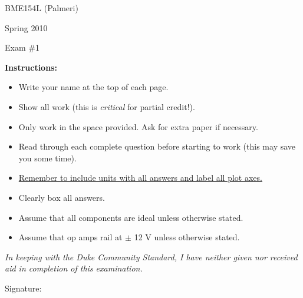 

\vspace*{0.5in}

\centerline{\LARGE BME154L (Palmeri)}
\vspace*{0.25in}
\centerline{\LARGE Spring 2010}
\vspace*{0.25in}
\centerline{\LARGE Exam \#1}
\vspace*{0.25in}

{\bf Instructions:} 
\begin{itemize}
\item Write your name at the top of each page.
\item Show all work (this is {\it critical} for partial credit!).
\item Only work in the space provided.  Ask for extra paper if necessary.
\item Read through each complete question before starting to work (this may
save you some time).
\item \underline{Remember to include units with all answers and label all plot axes.}
\item Clearly box all answers.
\item Assume that all components are ideal unless otherwise stated.
\item Assume that op amps rail at $\pm$ 12 V unless otherwise stated.
\end{itemize}

\vspace*{2.0in}

\emph{In keeping with the Duke Community Standard, I have neither given nor received aid in completion of this examination.}

\vspace*{0.5in}

Signature:\underline{\hspace*{3.0in}}
